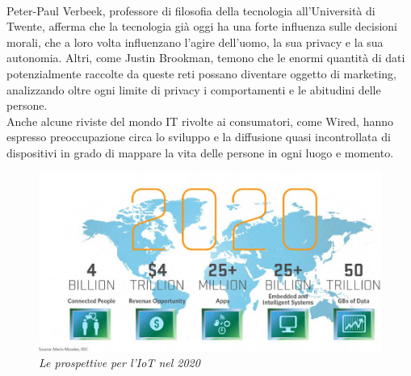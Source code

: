 \\Peter-Paul Verbeek, professore di filosofia della tecnologia all'Università di Twente, afferma che la tecnologia già oggi ha una forte influenza sulle decisioni morali, che a loro volta influenzano l'agire dell'uomo, la sua privacy e la sua autonomia. Altri, come Justin Brookman, temono che le enormi quantità di dati potenzialmente raccolte da queste reti possano diventare oggetto di marketing, analizzando oltre ogni limite di privacy i comportamenti e le abitudini delle persone.
\\Anche alcune riviste del mondo IT rivolte ai consumatori, come Wired, hanno espresso preoccupazione circa lo sviluppo e la diffusione quasi incontrollata di dispositivi in grado di mappare la vita delle persone in ogni luogo e momento.
\begin{figure}[hb]
\centering
\includegraphics[scale=1.00]{immagini/iot-2020.jpg}
\caption{\textit{Le prospettive per l'IoT nel 2020}}
\end{figure}


